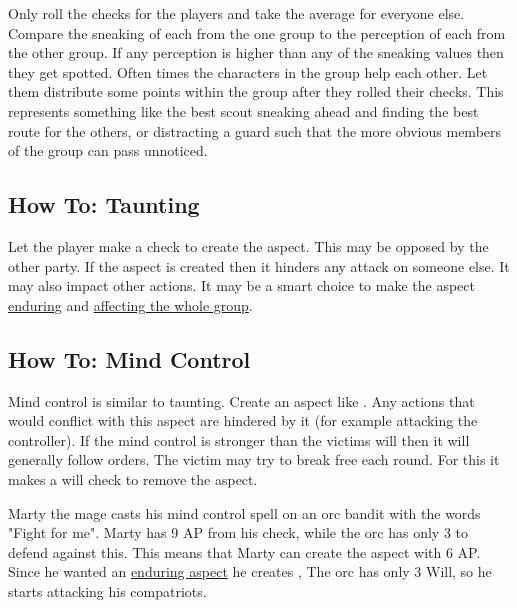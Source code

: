 \documentclass[11pt]{article}
\begin{document}
{Only roll the checks for the players and take the average for everyone else. Compare the sneaking of each from the one group to the perception of each from the other group. If any perception is higher than any of the sneaking values then they get spotted.
Often times the characters in the group help each other. Let them distribute some points within the group after they rolled their checks. This represents something like the best scout sneaking ahead and finding the best route for the others, or distracting a guard such that the more obvious members of the group can pass unnoticed.
\subsection{How To: Taunting}
\label{sec:org15cbdf0}
Let the player make a check to create the  aspect. This may be opposed by the other party. If the aspect is created then it hinders any attack on someone else. It may also impact other actions. It may be a smart choice to make the  aspect \hyperref[sec:org113a79a]{enduring} and \hyperref[sec:orgc32812f]{affecting the whole group}. 
\subsection{How To: Mind Control}
\label{sec:orgb7fee8d}
Mind control is similar to taunting. Create an aspect like . Any actions that would conflict with this aspect are hindered by it (for example attacking the controller). If the mind control is stronger than the victims will then it will generally follow orders. The victim may try to break free each round. For this it makes a will check to remove the  aspect.

\begin{pwexample}
Marty the mage casts his mind control spell on an orc bandit with the words "Fight for me". Marty has 9 AP from his check, while the orc has only 3 to defend against this. This means that Marty can create the aspect with 6 AP. Since he wanted an \hyperref[sec:org113a79a]{enduring aspect} he creates , The orc has only 3 Will, so he starts attacking his compatriots. 
\end{pwexample}
}
\end{document}
